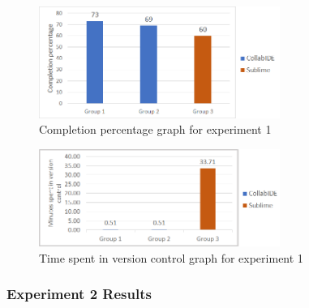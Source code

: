 \begin{figure}[htbp]
  \centering
  \includegraphics[width=0.7\textwidth]{img/completionCollaborative}
  \caption{Completion percentage graph for experiment 1}
  \label{fig:completionCollaborative}
\end{figure}

\begin{figure}[htbp]
  \centering
  \includegraphics[width=0.7\textwidth]{img/versionControlCollaborative}
  \caption{Time spent in version control graph for experiment 1}
  \label{fig:versionControlCollaborative}
\end{figure}

\subsubsection{Experiment 2 Results}

